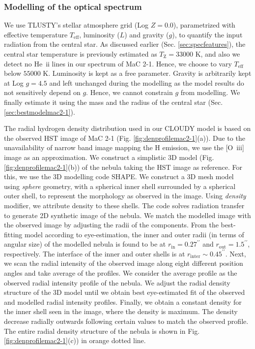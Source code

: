 \documentclass[a4paper,fleqn,usenatbib]{mnras}
\begin{document}
\subsubsection{Modelling of the optical spectrum} 
We use TLUSTY's stellar atmosphere grid \citep{2003ApJS..146..417L} (Log $Z=0.0$), parametrized with effective temperature $T_\mathrm{eff}$, luminosity ($L$) and gravity ($g$), to quantify the input radiation from the central star. As discussed earlier (Sec. \ref{sec:specfeatures}), the central star temperature is previously estimated as $T_\mathrm{Z}=33000$ K, and also we detect no He~{\sc ii} lines in our spectrum of MaC 2-1. Hence, we choose to vary $T_\mathrm{eff}$ below $55000$ K. Luminosity is kept as a free parameter. Gravity is arbitrarily kept at Log $g=4.5$ and left unchanged during the modelling as the model results do not sensitively depend on $g$. Hence, we cannot constrain $g$ from modelling. We finally estimate it using the mass and the radius of the central star (Sec. \ref{sec:bestmodelmac2-1}).  

The radial hydrogen density distribution used in our CLOUDY model is based on the observed HST image of MaC 2-1 (Fig. \ref{fig:denprofilemac2-1}(a)). Due to the unavailability of narrow band image mapping the H emission, we use the [O~{\sc iii}] image as an approximation. We construct a simplistic 3D model (Fig. \ref{fig:denprofilemac2-1}(b)) of the nebula taking the HST image as reference. For this, we use the 3D modelling code SHAPE. We construct a 3D mesh model using \textit{sphere} geometry, with a spherical inner shell surrounded by a spherical outer shell, to represent the morphology as observed in the image. Using \textit{density} modifier, we attribute density to these shells. The code solves radiation transfer to generate 2D synthetic image of the nebula. We match the modelled image with the observed image by adjusting the radii of the components. From the best-fitting model according to eye-estimation, the inner and outer radii (in terms of angular size) of the modelled nebula is found to be at $r_\mathrm{in}=0.27^{\prime\prime}$ and $r_\mathrm{out}=1.5^{\prime\prime}$, respectively. The interface of the inner and outer shells is at $r_\mathrm{inter}\sim0.45^{\prime\prime}$. Next, we scan the radial intensity of the observed image along eight different position angles and take average of the profiles. We consider the average profile as the observed radial intensity profile of the nebula. We adjust the radial density structure of the 3D model until we obtain best eye-estimated fit of the observed and modelled radial intensity profiles. Finally, we obtain a constant density for the inner shell seen in the image, where the density is maximum. The density decrease radially outwards following certain values to match the observed profile. The entire radial density structure of the nebula is shown in Fig. \ref{fig:denprofilemac2-1}(c)) in orange dotted line.
\end{document}
